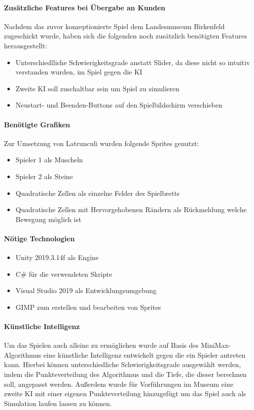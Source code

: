 \paragraph{Zusätzliche Features bei Übergabe an Kunden}
Nachdem das zuvor konzeptionierte Spiel dem Landesmuseum Birkenfeld zugeschickt wurde, haben sich die folgenden noch zusätzlich benötigten Features herausgestellt:
\begin{itemize}
	\item Unterschiedlliche Schwierigkeitsgrade anstatt Slider, da diese nicht so intuitiv verstanden wurden, im Spiel gegen die KI
	\item Zweite KI soll zuschaltbar sein um Spiel zu simulieren
	\item Neustart- und Beenden-Buttons auf den Spielbildschirm verschieben	
\end{itemize}


\paragraph{Benötigte Grafiken}
Zur Umsetzung von Latrunculi wurden folgende Sprites genutzt:
\begin{itemize}
	\item Spieler 1 als Muscheln
	\item Spieler 2 als Steine
	\item Quadratische Zellen als einzelne Felder des Spielbretts
	\item Quadratische Zellen mit Hervorgehobenen Rändern als Rückmeldung welche Bewegung möglich ist
\end{itemize}

\paragraph{Nötige Technologien}
\begin{itemize}
	\item Unity 2019.3.14f als Engine
	\item C\# für die verwendeten Skripte
	\item Visual Studio 2019 als Entwicklungsumgebung 
	\item GIMP zum erstellen und bearbeiten von Sprites
\end{itemize}

\paragraph{Künstliche Intelligenz}
Um das Spielen auch alleine zu ermöglichen wurde auf Basis des MiniMax-Algorithmus eine künstliche Intelligenz entwickelt gegen die ein Spieler antreten kann. Hierbei können unterschiedliche Schwierigkeitsgrade ausgewählt werden, indem die Punkteverteilung des Algorithmus und die Tiefe, die dieser berechnen soll, angepasst werden. Außerdem wurde für Vorführungen im Museum eine zweite KI mit einer eigenen Punkteverteilung hinzugefügt um das Spiel auch als Simulation laufen lassen zu können.

